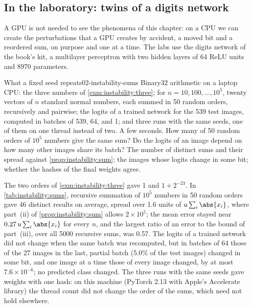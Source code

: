 \begin{refsection}
\section{In the laboratory: twins of a digits network}\label{sec:instability:lab}

A GPU is not needed to see the phenomena of this chapter: on a CPU we can create the perturbations that a GPU creates by accident, a moved bit and a reordered sum, on purpose and one at a time. The labs use the digits network of the book's kit, a multilayer perceptron with two hidden layers of 64 ReLU units and 8970 parameters.

\begin{lab}{What a fixed seed repeats}{02-instability-sums}\label{lab:instability:sums}
 Binary32 arithmetic on a laptop CPU: the three numbers of \cref{exm:instability:three}; for $n=10,100,\dots,10^5$, twenty vectors of $n$ standard normal numbers, each summed in 50 random orders, recursively and pairwise; the logits of a trained network for the 539 test images, computed in batches of 539, 64, and 1; and three runs with the same seeds, one of them on one thread instead of two. A few seconds.
 How many of 50 random orders of $10^5$ numbers give the same sum? Do the logits of an image depend on how many other images share its batch?
 The number of distinct sums and their spread against \cref{prop:instability:sum}; the images whose logits change in some bit; whether the hashes of the final weights agree.
\end{lab}

The two orders of \cref{exm:instability:three} gave 1 and $1+2^{-23}$. In \cref{tab:instability:sums}, recursive summation of $10^5$ numbers in 50 random orders gave 46 distinct results on average, spread over 1.6 units of $u\sum_i\abs{x_i}$, where part~(ii) of \cref{prop:instability:sum} allows $2\times10^5$; the mean error stayed near $0.27\,u\sum_i\abs{x_i}$ for every $n$, and the largest ratio of an error to the bound of part~(iii), over all 5000 recursive sums, was 0.57. The logits of a trained network did not change when the same batch was recomputed, but in batches of 64 those of the 27 images in the last, partial batch (5.0\% of the test images) changed in some bit, and one image at a time those of every image changed, by at most $7.6\times10^{-6}$; no predicted class changed. The three runs with the same seeds gave weights with one hash: on this machine (PyTorch 2.13 with Apple's Accelerate library) the thread count did not change the order of the sums, which need not hold elsewhere.


\end{refsection}
